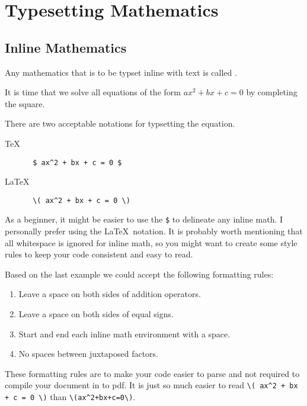 \chapter{Typesetting Mathematics}

\section{Inline Mathematics}
Any mathematics that is to be typset inline with text is called 
.  

\begin{example}
It is time that we solve all equations of the form \(ax^2 + bx + c = 0 \) by 
completing the square.  

There are two acceptable notations for typsetting the equation.  
\begin{description}
    \item[TeX] \verb! $ ax^2 + bx + c = 0 $ !
    \item[LaTeX] \verb! \( ax^2 + bx + c = 0 \) !
\end{description}

\end{example}

As a beginner, it might be easier to use the \verb!$! to delineate any inline
math.  I personally prefer using the \LaTeX\, notation.  It is probably  
worth mentioning that all whitespace is ignored for inline math, so you 
might want to create some style rules to keep your code consistent and 
easy to read.  

Based on the last example we could accept the following formatting rules:

\begin{enumerate}
    \item Leave a space on both sides of addition operators.
    \item Leave a space on both sides of equal signs.
    \item Start and end each inline math environment with a space.
    \item No spaces between juxtaposed factors.
\end{enumerate}

These formatting rules are to make your code easier to parse and not required
to compile your document in to pdf.  It is just so much easier to read 
\verb!\( ax^2 + bx + c = 0 \)! than \verb!\(ax^2+bx+c=0\)!.

